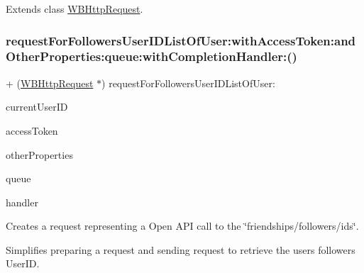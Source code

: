 Extends class \mbox{\hyperlink{interface_w_b_http_request_a62303f19ac35267cff108384061f1de7}{W\+B\+Http\+Request}}.

\mbox{\label{category_w_b_http_request_07_weibo_user_08_a62303f19ac35267cff108384061f1de7}} 
\subsubsection{\texorpdfstring{request\+For\+Followers\+User\+I\+D\+List\+Of\+User\+:with\+Access\+Token\+:and\+Other\+Properties\+:queue\+:with\+Completion\+Handler\+:()}{requestForFollowersUserIDListOfUser:withAccessToken:andOtherProperties:queue:withCompletionHandler:()}\hspace{0.1cm}{\footnotesize\ttfamily [2/3]}}
{\footnotesize\ttfamily + (\mbox{\hyperlink{interface_w_b_http_request}{W\+B\+Http\+Request}} $\ast$) request\+For\+Followers\+User\+I\+D\+List\+Of\+User\+: \begin{DoxyParamCaption}\item[{(N\+S\+String $\ast$)}]{current\+User\+ID }\item[{withAccessToken:(N\+S\+String $\ast$)}]{access\+Token }\item[{andOtherProperties:(N\+S\+Dictionary $\ast$)}]{other\+Properties }\item[{queue:(N\+S\+Operation\+Queue $\ast$)}]{queue }\item[{withCompletionHandler:(W\+B\+Request\+Handler)}]{handler }\end{DoxyParamCaption}}

Creates a request representing a Open A\+PI call to the \char`\"{}friendships/followers/ids\char`\"{}.

Simplifies preparing a request and sending request to retrieve the user\textquotesingle{}s followers\textquotesingle{} User\+ID.

